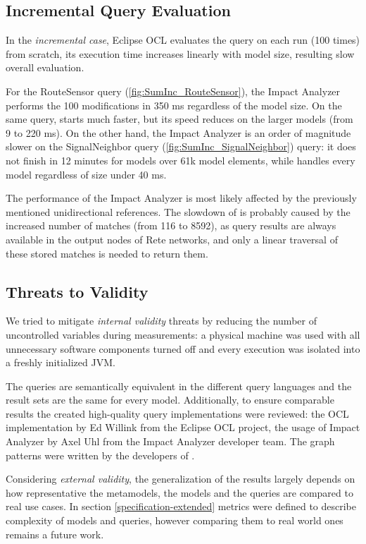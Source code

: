 \subsection{Incremental Query Evaluation}
In the \emph{incremental case}, Eclipse OCL evaluates the query on each run
(100 times) from scratch, its execution time increases linearly with
model size, resulting slow overall evaluation.

For the \textsf{RouteSensor} query (\autoref{fig:SumInc_RouteSensor}), the Impact
Analyzer performs the 100 modifications in 350 ms regardless of the model
size. On the same query, \incquery{} starts much faster, but its speed reduces
on the larger models (from 9 to 220 ms). On the other hand, the Impact
Analyzer is an order of magnitude slower on the \textsf{SignalNeighbor} query
(\autoref{fig:SumInc_SignalNeighbor}) query: it does not finish in 12 minutes
for models over 61k model elements, while \incquery{} handles every model
regardless of size under 40 ms.

The performance of the Impact Analyzer is most likely affected by the previously
mentioned unidirectional references. The slowdown of \incquery{} is probably
caused by the increased number of matches (from 116 to 8592), as query
results are always available in the output nodes of Rete networks, and only a
linear traversal of these stored matches is needed to return them.

\subsection{Threats to Validity}
We tried to mitigate \emph{internal validity} threats by reducing the number of
uncontrolled variables during measurements: a physical machine was used with all
unnecessary software components turned off and every execution was isolated into
a freshly initialized JVM.

The queries are semantically equivalent in the different query languages and the
result sets are the same for every model. Additionally, to ensure comparable
results the created high-quality query implementations were reviewed: the OCL
implementation by Ed Willink from the Eclipse OCL project, the usage of Impact
Analyzer by Axel Uhl from the Impact Analyzer developer team. The graph patterns
were written by the developers of \incquery{}.

Considering \emph{external validity}, the generalization of the results largely
depends on how representative the metamodels, the models and the queries are
compared to real use cases. In section \ref{specification-extended} metrics were
defined to describe complexity of models and queries, however comparing them to
real world ones remains a future work.

